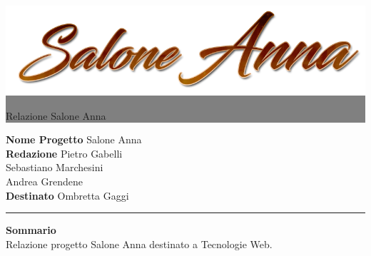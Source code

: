 \documentclass[12pt,a4paper,titlepage]{article}
\newcommand{\HRule}[1]{\hfill \rule{0.2\linewidth}{#1}} %
\begin{document}
	
	\thispagestyle{empty} %
	
	
	\colorbox{grey}{
		\parbox[t]{1.0\linewidth}{
			\centering \fontsize{50pt}{80pt}\selectfont %
			\vspace*{0.7cm} %
			
			\raggedleft
			\includegraphics[width=0.7\linewidth]{../public_html/img/logo.png}
			
			\hfill Relazione Salone Anna \\
			
			\vspace*{0.7cm} %
		}
	}
	
	
	\vfill %
	
	
	{\centering \large 
		\hfill \textbf{Nome Progetto} Salone Anna \\
		\hfill \textbf{Redazione} 	Pietro Gabelli \\
		\hfill 						Sebastiano Marchesini \\
		\hfill						Andrea Grendene \\
		\hfill \textbf{Destinato} 	Ombretta Gaggi \\ 
		
		\HRule{1pt}
		
		\textbf{Sommario} \\
		Relazione progetto Salone Anna destinato a Tecnologie Web.
		
	} %
	
\end{document}

